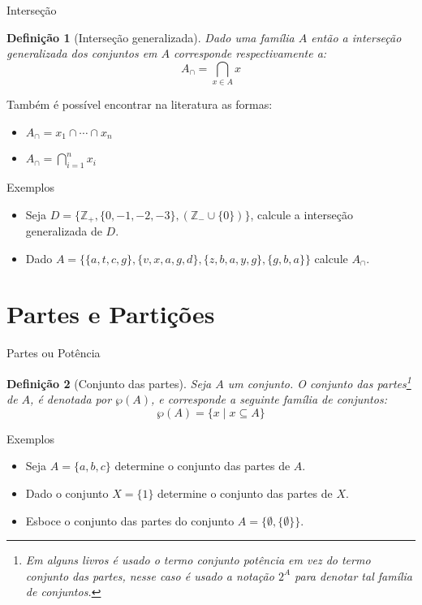 \documentclass[aspectratio=169]{beamer}
\newtheorem{defi}{Definição}
\begin{document}
	\begin{frame}{Interseção}
		\begin{defi}[Interseção generalizada]\label{def:IntersecaoGeneralizadas}
			Dado uma família $A$ então a interseção generalizada dos conjuntos em $A$ corresponde respectivamente a:
			$$A_\cap = \bigcap_{x \in A} x$$
		\end{defi}
		\pause
		Também é possível encontrar na literatura as formas:
		\begin{itemize}
			\item $\displaystyle A_\cap = x_1 \cap \cdots \cap x_n$
			\item $\displaystyle A_\cap = \bigcap_{i = 1}^n x_i$
		\end{itemize}
	\end{frame}

	\begin{frame}{Exemplos}
		\begin{itemize}
			\item Seja $D = \{\mathbb{Z}_+, \{0, -1, -2, -3\}, (\mathbb{Z}_- \cup \{0\})\}$, calcule a interseção generalizada de $D$.
			\item Dado $A = \{\{a, t, c, g\}, \{v, x, a, g, d\}, \{z, b, a, y, g\}, \{g, b, a\}\}$ calcule $A_\cap$.
		\end{itemize}
	\end{frame}
	
	\section{Partes e Partições}
	
	\begin{frame}{Partes ou Potência}
		\begin{defi}[Conjunto das partes]\label{def:ConjuntoDasPartes}
			Seja $A$ um conjunto. O conjunto das partes\footnote{Em alguns livros é usado o termo conjunto potência em vez do termo conjunto das partes, nesse caso é usado a notação $2^A$ para denotar tal família de conjuntos.} de $A$, é denotada por $\wp(A)$, e corresponde a seguinte família de conjuntos:
			$$\wp(A) = \{x \mid x \subseteq A\}$$
		\end{defi}
	\end{frame}

	\begin{frame}{Exemplos}
		\begin{itemize}
			\item Seja $A = \{a, b, c\}$ determine o conjunto das partes de $A$.
			\item Dado o conjunto $X = \{1\}$ determine o conjunto das partes de $X$.
			\item Esboce o conjunto das partes do conjunto $A = \{\emptyset, \{\emptyset\} \}$.
		\end{itemize}
	\end{frame}
	
\end{document}
